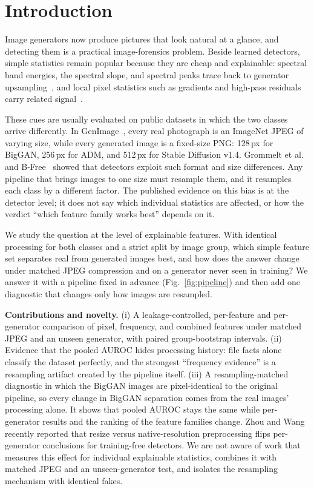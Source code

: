 \documentclass[conference]{IEEEtran}
\begin{document}
\section{Introduction}

Image generators now produce pictures that look natural at a glance, and detecting them is a practical image-forensics problem. Beside learned detectors, simple statistics remain popular because they are cheap and explainable: spectral band energies, the spectral slope, and spectral peaks trace back to generator upsampling~\cite{frank2020leveraging,dzanic2020fourier,durall2020watch,zhang2019artifacts}, and local pixel statistics such as gradients and high-pass residuals carry related signal~\cite{nataraj2019cooccurrence,tan2024npr}.

These cues are usually evaluated on public datasets in which the two classes arrive differently. In GenImage~\cite{zhu2023genimage}, every real photograph is an ImageNet JPEG of varying size, while every generated image is a fixed-size PNG: 128\,px for BigGAN, 256\,px for ADM, and 512\,px for Stable Diffusion v1.4. Grommelt et al.~\cite{grommelt2024fake} and B-Free~\cite{guillaro2025bfree} showed that detectors exploit such format and size differences. Any pipeline that brings images to one size must resample them, and it resamples each class by a different factor. The published evidence on this bias is at the detector level; it does not say which individual statistics are affected, or how the verdict ``which feature family works best'' depends on it.

We study the question at the level of explainable features. With identical processing for both classes and a strict split by image group, which simple feature set separates real from generated images best, and how does the answer change under matched JPEG compression and on a generator never seen in training? We answer it with a pipeline fixed in advance (Fig.~\ref{fig:pipeline}) and then add one diagnostic that changes only how images are resampled.

\textbf{Contributions and novelty.} (i) A leakage-controlled, per-feature and per-generator comparison of pixel, frequency, and combined features under matched JPEG and an unseen generator, with paired group-bootstrap intervals. (ii) Evidence that the pooled AUROC hides processing history: file facts alone classify the dataset perfectly, and the strongest ``frequency evidence'' is a resampling artifact created by the pipeline itself. (iii) A resampling-matched diagnostic in which the BigGAN images are pixel-identical to the original pipeline, so every change in BigGAN separation comes from the real images' processing alone. It shows that pooled AUROC stays the same while per-generator results and the ranking of the feature families change. Zhou and Wang~\cite{zhou2026fragile} recently reported that resize versus native-resolution preprocessing flips per-generator conclusions for training-free detectors. We are not aware of work that measures this effect for individual explainable statistics, combines it with matched JPEG and an unseen-generator test, and isolates the resampling mechanism with identical fakes.
\end{document}
